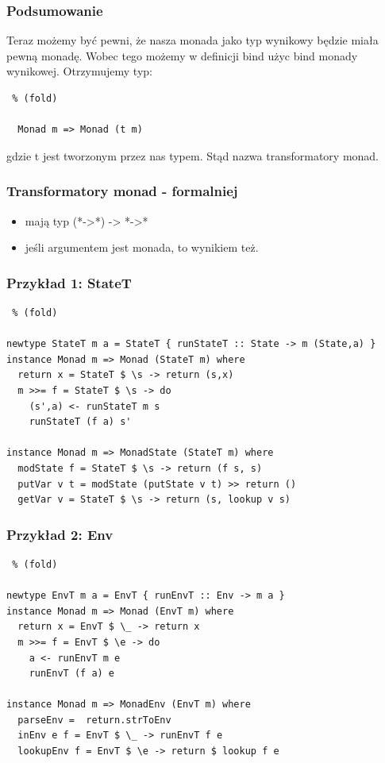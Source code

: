 \documentclass{beamer}
\begin{document}
\begin{frame}[fragile] %
  \frametitle{Podsumowanie}
  Teraz możemy być pewni, że nasza monada jako typ wynikowy będzie miała pewną monadę. Wobec tego możemy w definicji bind użyc bind monady wynikowej.
  Otrzymujemy typ: 
  \begin{lstlisting} % (fold)

  Monad m => Monad (t m)

  \end{lstlisting}
  gdzie t jest tworzonym przez nas typem. Stąd nazwa transformatory monad.
\end{frame}

\begin{frame}[fragile] %
  \frametitle{Transformatory monad - formalniej}
  \begin{itemize}
    \item mają typ (*->*) -> *->*
    \item jeśli argumentem jest monada, to wynikiem też.
  \end{itemize}
\end{frame}

\begin{frame}[fragile] %
  \frametitle{Przykład 1: StateT}
  \begin{lstlisting} % (fold)

newtype StateT m a = StateT { runStateT :: State -> m (State,a) }
instance Monad m => Monad (StateT m) where
  return x = StateT $ \s -> return (s,x)
  m >>= f = StateT $ \s -> do
    (s',a) <- runStateT m s
    runStateT (f a) s'

instance Monad m => MonadState (StateT m) where
  modState f = StateT $ \s -> return (f s, s)
  putVar v t = modState (putState v t) >> return ()
  getVar v = StateT $ \s -> return (s, lookup v s)

  \end{lstlisting}
\end{frame}

\begin{frame}[fragile] %
  \frametitle{Przykład 2: Env}
  \begin{lstlisting} % (fold)

newtype EnvT m a = EnvT { runEnvT :: Env -> m a }
instance Monad m => Monad (EnvT m) where
  return x = EnvT $ \_ -> return x
  m >>= f = EnvT $ \e -> do
    a <- runEnvT m e
    runEnvT (f a) e

instance Monad m => MonadEnv (EnvT m) where
  parseEnv =  return.strToEnv
  inEnv e f = EnvT $ \_ -> runEnvT f e
  lookupEnv f = EnvT $ \e -> return $ lookup f e

  \end{lstlisting}
\end{frame}
\end{document}
